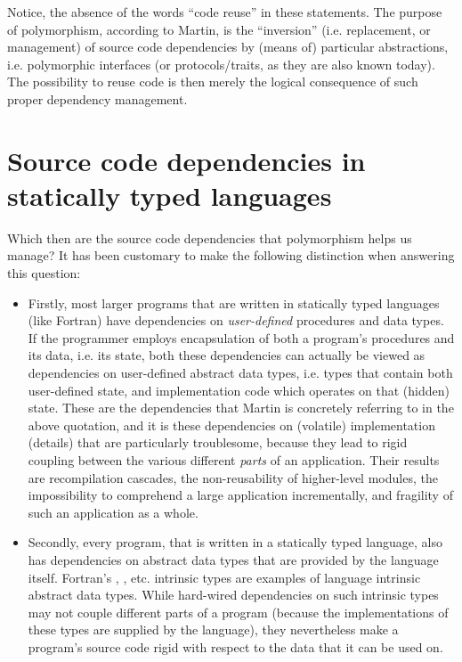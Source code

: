 \documentclass[11pt,oneside]{report}
\newcommand{\code}[1]{{\selectfont\ttfamily{#1}}}
\begin{document}
Notice, the absence of the words ``code reuse'' in these statements.
The purpose of polymorphism, according to Martin, is the ``inversion''
(i.e. replacement, or management) of source code dependencies by
(means of) particular abstractions, i.e. polymorphic interfaces (or
protocols/traits, as they are also known today). The possibility to
reuse code is then merely the logical consequence of such proper
dependency management.

\section{Source code dependencies in statically typed languages}

Which then are the source code dependencies that polymorphism helps us
manage? It has been customary to make the following distinction when
answering this question:
\begin{itemize}
\item
  Firstly, most larger programs that are written in statically typed
  languages (like Fortran) have dependencies on \emph{user-defined}
  procedures and data types. If the programmer employs encapsulation
  of both a program's procedures and its data, i.e. its state, both
  these dependencies can actually be viewed as dependencies on
  user-defined abstract data types, i.e. types that contain both
  user-defined state, and implementation code which operates on that
  (hidden) state. These are the dependencies that Martin is concretely
  referring to in the above quotation, and it is these dependencies on
  (volatile) implementation (details) that are particularly
  troublesome, because they lead to rigid coupling between the various
  different \emph{parts} of an application. Their results are
  recompilation cascades, the non-reusability of higher-level modules,
  the impossibility to comprehend a large application incrementally,
  and fragility of such an application as a whole.
\item
  Secondly, every program, that is written in a statically typed
  language, also has dependencies on abstract data types that are
  provided by the language itself. Fortran's \code{integer},
  \code{real}, etc. intrinsic types are examples of language intrinsic
  abstract data types. While hard-wired dependencies on such intrinsic
  types may not couple different parts of a program (because the
  implementations of these types are supplied by the language), they
  nevertheless make a program's source code rigid with respect to the
  data that it can be used on.
\end{itemize}
\end{document}
